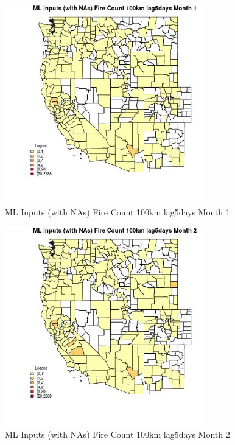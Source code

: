 \begin{figure} 
\centering  
\includegraphics[width=0.77\textwidth]{Code_Outputs/Report_ML_input_PM25_Step4_part_e_de_duplicated_aves_compiled_2019-05-20wNAs_CountyFire_Count_100km_lag5daysmedianMonth1.jpg} 
\caption{\label{fig:Report_ML_input_PM25_Step4_part_e_de_duplicated_aves_compiled_2019-05-20wNAsCountyFire_Count_100km_lag5daysmedianMonth1}ML Inputs (with NAs) Fire Count 100km lag5days Month 1} 
\end{figure} 
 

\begin{figure} 
\centering  
\includegraphics[width=0.77\textwidth]{Code_Outputs/Report_ML_input_PM25_Step4_part_e_de_duplicated_aves_compiled_2019-05-20wNAs_CountyFire_Count_100km_lag5daysmedianMonth2.jpg} 
\caption{\label{fig:Report_ML_input_PM25_Step4_part_e_de_duplicated_aves_compiled_2019-05-20wNAsCountyFire_Count_100km_lag5daysmedianMonth2}ML Inputs (with NAs) Fire Count 100km lag5days Month 2} 
\end{figure} 
 

